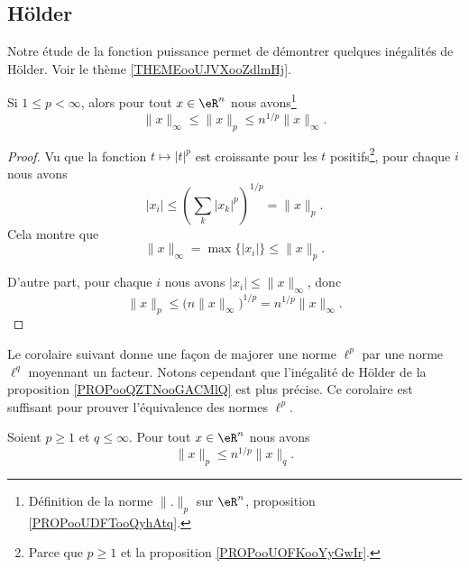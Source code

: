 \subsection{Hölder}

Notre étude de la fonction puissance permet de démontrer quelques inégalités de Hölder. Voir le thème \ref{THEMEooUJVXooZdlmHj}.

\begin{theorem}       \label{THOooPPDPooJxTYIy}
    Si \( 1\leq p <  \infty\), alors pour tout \( x\in \eR^n\) nous avons\footnote{Définition de la norme \( \| . \|_p\) sur \( \eR^n\), proposition \ref{PROPooUDFTooQyhAtq}.}
	\begin{equation}
		\| x \|_{\infty}\leq \| x \|_p\leq n^{1/p}\| x \|_{\infty}.
	\end{equation}
\end{theorem}

\begin{proof}
	Vu que la fonction \( t\mapsto | t |^p\) est croissante pour les \( t \) positifs\footnote{Parce que \( p\geq 1\) et la proposition \ref{PROPooUOFKooYyGwIr}.}, pour chaque \( i\) nous avons
	\begin{equation}
		| x_i |\leq \left( \sum_k| x_k |^p \right)^{1/p}=\| x \|_p.
	\end{equation}
	Cela montre que
	\begin{equation}
		\| x \|_{\infty}=\max\{ | x_i | \}\leq \| x \|_p.
	\end{equation}

	D'autre part, pour chaque \( i\) nous avons \( | x_i |\leq \| x \|_{\infty}\), donc
	\begin{equation}
		\| x \|_p\leq \big( n\| x \|_{\infty} \big)^{1/p}=n^{1/p}\| x \|_{\infty}.
	\end{equation}
\end{proof}

Le corolaire suivant donne une façon de majorer une norme \( \ell^p\) par une norme \( \ell^q\) moyennant un facteur. Notons cependant que l'inégalité de Hölder de la proposition \ref{PROPooQZTNooGACMlQ} est plus précise. Ce corolaire est suffisant pour prouver l'équivalence des normes \( \ell^p\).
\begin{corollary}       \label{CORooEZGHooACHOiB}
	Soient \( p\geq 1\) et \( q\leq \infty\). Pour tout \( x\in \eR^n\) nous avons
	\begin{equation}
		\| x \|_p\leq n^{1/p} \| x \|_q.
	\end{equation}
\end{corollary}

